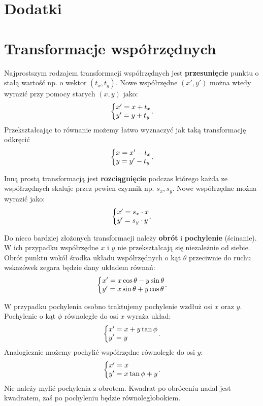 \documentclass[10pt,twocolumn,fleqn,polish]{article}
\makeatletter
\newenvironment{eqsystem}
  {\left\lbrace
    \begin{array}{@{}l@{}}}
  {\end{array}\right.}
\makeatother
\begin{document}
\section{Dodatki}
\section*{Transformacje współrzędnych}

Najprostszym rodzajem transformacji współrzędnych jest \textbf{przesunięcie}
punktu o stałą wartość np. o wektor $(t_x, t_y)$. Nowe współrzędne $(x', y')$
można wtedy wyrazić przy pomocy starych $(x, y)$ jako:
\[
  \begin{eqsystem}
    x' = x + t_x \\
    y' = y + t_y
  \end{eqsystem}.
\]
Przekształcając to równanie możemy łatwo wyznaczyć jak taką transformację
odkręcić
\[
  \begin{eqsystem}
    x = x' - t_x \\
    y = y' - t_y
  \end{eqsystem}.
\]

Inną prostą transformacją jest \textbf{rozciągnięcie} podczas którego każda
ze współrzędnych skaluje przez pewien czynnik np. $s_x, s_y$.
Nowe współrzędne można wyrazić jako:
\[
  \begin{eqsystem}
    x' = s_x \cdot x \\
    y' = s_y \cdot y
  \end{eqsystem}.
\]

Do nieco bardziej złożonych transformacji należy \textbf{obrót} i
\textbf{pochylenie} (ścinanie). W ich przypadku współrzędne $x$ i $y$ nie
przekształcają się niezależnie od siebie.
Obrót punktu wokół środka układu współrzędnych o kąt $\theta$ przeciwnie do ruchu
wskazówek zegara będzie dany układem równań:
\[
  \begin{eqsystem}
    x' = x \cos \theta - y \sin \theta \\
    y' = x \sin \theta + y \cos \theta
  \end{eqsystem}.
\]

W przypadku pochylenia osobno traktujemy pochylenie wzdłuż osi $x$ oraz $y$.
Pochylenie o kąt $\phi$ równoległe do osi $x$ wyraża układ:
\[
  \begin{eqsystem}
    x' = x + y \tan\phi \\
    y' = y
  \end{eqsystem}.
\]
Analogicznie możemy pochylić współrzędne równolegle do osi $y$:
\[
  \begin{eqsystem}
    x' = x \\
    y' = x \tan\phi + y
  \end{eqsystem}.
\]
Nie należy mylić pochylenia z obrotem. Kwadrat po obróceniu nadal jest kwadratem,
zaś po pochyleniu będzie równoległobokiem.
\end{document}
